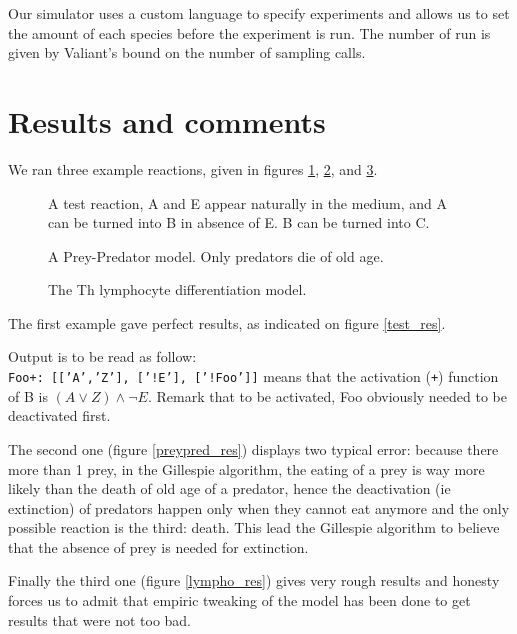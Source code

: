 \documentclass{llncs}
\begin{document}
Our simulator uses a custom language to specify experiments and allows us to set the amount of each species before the experiment is run. The number of run is given by Valiant's bound on the number of sampling calls.


\section{Results and comments}

We ran three example reactions, given in figures \ref{test}, \ref{preypred}, and \ref{lympho}.
\begin{figure}[htbp]
	
	\vspace{-1em}
	\caption{A test reaction, A and E appear naturally in the medium, and A can be turned into B in absence of E. B  can be turned into C.\label{test}}
\end{figure}
\begin{figure}[htbp]
	
	\vspace{-1em}
	\caption{A Prey-Predator model. Only predators die of old age.\label{preypred}}
\end{figure}
\begin{figure}[htbp]
	
	\vspace{-1em}
	\caption{The Th lymphocyte differentiation model.\label{lympho}}
\end{figure}

The first example gave perfect results, as indicated on figure \ref{test_res}.

Output is to be read as follow:\\
\texttt{Foo+:~[['A','Z'],~['!E'],~['!Foo']]} means that the activation (\texttt{+}) function of B is $(A \vee Z)\wedge\neg E$. Remark that to be activated, Foo obviously needed to be deactivated first.

The second one (figure \ref{preypred_res}) displays two typical error: because there more than 1 prey, in the Gillespie algorithm, the eating of a prey is way more likely than the death of old age of a predator, hence the deactivation (ie extinction) of predators happen only when they cannot eat anymore and the only possible reaction is the third: death. This lead the Gillespie algorithm to believe that the absence of prey is needed for extinction.

Finally the third one (figure \ref{lympho_res}) gives very rough results and honesty forces us to admit that empiric tweaking of the model has been done to get results that were not too bad.
\end{document}
